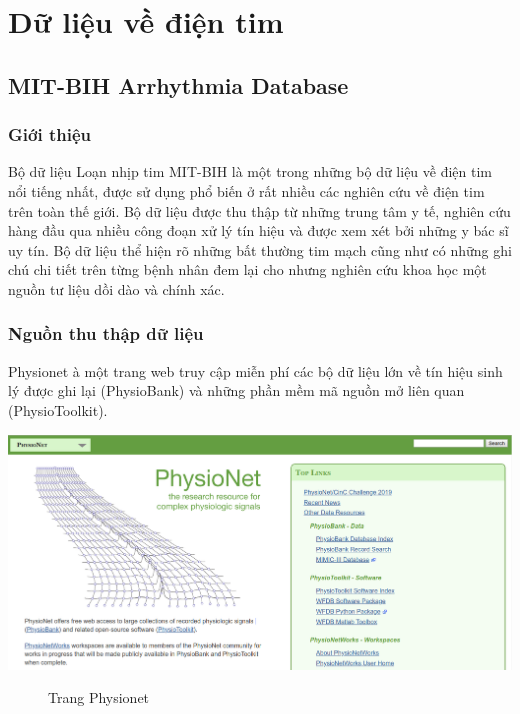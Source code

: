 \chapter{Dữ liệu về điện tim}
\thispagestyle{fancy}

\section{MIT-BIH Arrhythmia Database}
\subsection{Giới thiệu}
Bộ dữ liệu Loạn nhịp tim MIT-BIH là một trong những bộ dữ liệu về điện tim nổi tiếng nhất, được sử dụng phổ biến ở rất nhiều các nghiên cứu về điện tim trên toàn thế giới. Bộ dữ liệu được thu thập từ những trung tâm y tế, nghiên cứu hàng đầu qua nhiều công đoạn xử lý tín hiệu và được xem xét bởi những y bác sĩ uy tín. Bộ dữ liệu thể hiện rõ những bất thường tim mạch cũng như có những ghi chú chi tiết trên từng bệnh nhân đem lại cho nhưng nghiên cứu khoa học một nguồn tư liệu dồi dào và chính xác.
\subsection{Nguồn thu thập dữ liệu}
Physionet à một trang web truy cập miễn phí các bộ dữ liệu lớn về tín hiệu sinh lý được ghi lại (PhysioBank) và những phần mềm mã nguồn mở liên quan (PhysioToolkit).
\begin{center}
    \includegraphics[scale=.3]{image/chapter2/Screenshot_from_2019-03-11_04-58-18.png}
    \begin{figure}[htp]
    \begin{center}
    \end{center}
    \caption{Trang Physionet}
    \end{figure}
\end{center}

